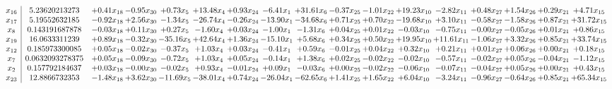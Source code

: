\documentclass[9pt]{article}
\begin{document}
 \[\begin{array}{c| c c@{\hskip 2pt} c@{\hskip 2pt} c@{\hskip 2pt} c@{\hskip 2pt} c@{\hskip 2pt} c@{\hskip 2pt} c@{\hskip 2pt} c@{\hskip 2pt} c@{\hskip 2pt} c@{\hskip 2pt} c@{\hskip 2pt} c@{\hskip 2pt} c@{\hskip 2pt} c@{\hskip 2pt} c@{\hskip 2pt} }
 x_{16}   &  5.23620213273 & +  0.41 x_{18} & -0.95 x_{30} & +  0.73 x_{5} & + 13.48 x_{4} & +  0.93 x_{24} & -6.41 x_{1} & + 31.61 x_{6} & -0.37 x_{25} & -1.01 x_{22} & + 19.23 x_{10} & -2.82 x_{11} & +  0.48 x_{27} & +  1.54 x_{26} & +  0.29 x_{21} & +  4.71 x_{15}\\
 x_{17}   &  5.19552632185 & -0.92 x_{18} & +  2.56 x_{30} & -1.34 x_{5} & -26.74 x_{4} & -0.26 x_{24} & -13.90 x_{1} & -34.68 x_{6} & +  0.71 x_{25} & +  0.70 x_{22} & -19.68 x_{10} & +  3.10 x_{11} & -0.58 x_{27} & -1.58 x_{26} & +  0.87 x_{21} & + 31.72 x_{15}\\
 x_{8}   &  0.143191687878 & -0.03 x_{18} & +  0.11 x_{30} & +  0.27 x_{5} & -1.60 x_{4} & +  0.03 x_{24} & -1.00 x_{1} & -1.31 x_{6} & +  0.04 x_{25} & +  0.01 x_{22} & -0.03 x_{10} & -0.75 x_{11} & -0.00 x_{27} & -0.05 x_{26} & +  0.01 x_{21} & +  0.86 x_{15}\\
 x_{19}   &  16.0633311239 & +  0.89 x_{18} & -0.32 x_{30} & -35.16 x_{5} & + 42.64 x_{4} & +  1.36 x_{24} & -15.10 x_{1} & +  5.68 x_{6} & +  0.34 x_{25} & +  0.50 x_{22} & + 19.95 x_{10} & + 11.61 x_{11} & -1.06 x_{27} & +  3.32 x_{26} & +  0.85 x_{21} & + 33.74 x_{15}\\
 x_{12}   &  0.185973300085 & +  0.05 x_{18} & -0.02 x_{30} & -0.37 x_{5} & +  1.03 x_{4} & +  0.03 x_{24} & -0.41 x_{1} & +  0.59 x_{6} & -0.01 x_{25} & +  0.04 x_{22} & +  0.32 x_{10} & +  0.21 x_{11} & +  0.01 x_{27} & +  0.06 x_{26} & +  0.00 x_{21} & +  0.18 x_{15}\\
 x_{7}   &  0.0632093278375 & +  0.05 x_{18} & -0.09 x_{30} & -0.72 x_{5} & +  1.03 x_{4} & +  0.05 x_{24} & -0.14 x_{1} & +  1.38 x_{6} & +  0.02 x_{25} & -0.02 x_{22} & -0.02 x_{10} & -0.57 x_{11} & -0.02 x_{27} & +  0.05 x_{26} & -0.04 x_{21} & -1.12 x_{15}\\
 x_{2}   &  0.157792184637 & +  0.03 x_{18} & -0.00 x_{30} & -0.02 x_{5} & +  0.93 x_{4} & -0.01 x_{24} & +  0.09 x_{1} & -0.03 x_{6} & +  0.00 x_{25} & -0.02 x_{22} & -0.06 x_{10} & -0.07 x_{11} & -0.04 x_{27} & +  0.05 x_{26} & +  0.00 x_{21} & +  0.43 x_{15}\\
 x_{23}   &  12.8866732353 & -1.48 x_{18} & +  3.62 x_{30} & -11.69 x_{5} & -38.01 x_{4} & +  0.74 x_{24} & -26.04 x_{1} & -62.65 x_{6} & +  1.41 x_{25} & +  1.65 x_{22} & +  6.04 x_{10} & -3.24 x_{11} & -0.96 x_{27} & -0.64 x_{26} & +  0.85 x_{21} & + 65.34 x_{15}\\

\end{array}\]
\end{document}
